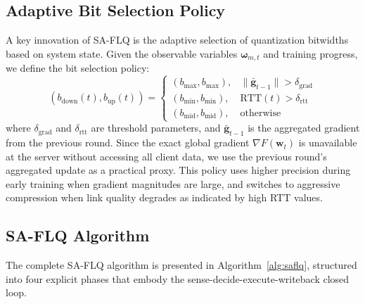 \documentclass[journal]{IEEEtran}
\begin{document}
\subsection{Adaptive Bit Selection Policy}
A key innovation of SA-FLQ is the adaptive selection of quantization bitwidths based on system state. Given the observable variables $\boldsymbol{\omega}_{m,t}$ and training progress, we define the bit selection policy:
\begin{equation}
    (b_{\text{down}}(t), b_{\text{up}}(t)) = 
    \begin{cases}
        (b_{\max}, b_{\max}), & \|\bar{\mathbf{g}}_{t-1}\| > \delta_{\text{grad}} \\
        (b_{\min}, b_{\min}), & \mathrm{RTT}(t) > \delta_{\text{rtt}} \\
        (b_{\text{mid}}, b_{\text{mid}}), & \text{otherwise}
    \end{cases}
    \label{eq:bit_policy}
\end{equation}
where $\delta_{\text{grad}}$ and $\delta_{\text{rtt}}$ are threshold parameters, and $\bar{\mathbf{g}}_{t-1}$ is the aggregated gradient from the previous round. Since the exact global gradient $\nabla F(\mathbf{w}_t)$ is unavailable at the server without accessing all client data, we use the previous round's aggregated update as a practical proxy. This policy uses higher precision during early training when gradient magnitudes are large, and switches to aggressive compression when link quality degrades as indicated by high RTT values.

\subsection{SA-FLQ Algorithm}
The complete SA-FLQ algorithm is presented in Algorithm~\ref{alg:saflq}, structured into four explicit phases that embody the sense-decide-execute-writeback closed loop.
\end{document}
